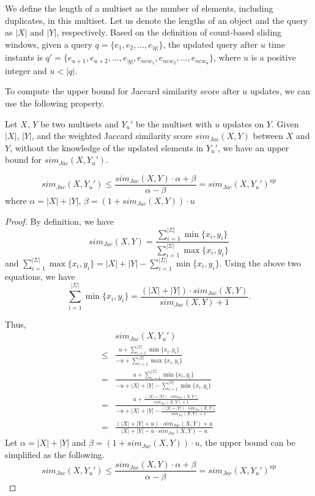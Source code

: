 We define the length of a multiset as the number of elements, including duplicates, in this multiset. Let us denote the lengths of an object and the query as $|X|$ and $|Y|$, respectively. Based on the definition of count-based sliding windows, %
%
%
given a query $q=\{e_1, e_2,..., e_{|q|}\}$, the updated query after $u$ time instants is $q'=\{e_{u+1}, e_{u+2}, ..., e_{|q|}, e_{new_1}, e_{new_2}, ..., e_{new_u}\}$, where $u$ is a positive integer and $u<|q|$.

To compute the upper bound for Jaccard similarity score after $u$ updates, we can use the following property.

\begin{property}%
Let $X$, $Y$ be two multisets and $Y_u'$ be the multiset with $u$ updates on $Y$. Given $|X|$, $|Y|$, and the weighted Jaccard similarity score $sim_{Jac}(X, Y)$ between $X$ and $Y$, without the knowledge of the updated elements in $Y_u'$, we have an upper bound for $sim_{Jac}(X, Y_u')$.

$$sim_{Jac}(X, Y_u') \leq \frac{sim_{Jac}(X, Y)\cdot \alpha+\beta}{\alpha-\beta} = sim_{Jac}(X, Y_u')^{up}$$ where $\alpha = |X| + |Y|$, $\beta = (1+sim_{Jac}(X, Y))\cdot u$
\end{property}

\begin{proof}
By definition, we have $$sim_{Jac}(X, Y) = \frac{\sum_{i=1}^{|\Sigma|} \min\{x_i, y_i\}}{\sum_{i=1}^{|\Sigma|} \max\{x_i, y_i\}}$$ and $\sum_{i=1}^{|\Sigma|} \max\{x_i, y_i\}=|X|+|Y|- \sum_{i=1}^{|\Sigma|} \min\{x_i, y_i\}$. Using the above two equations, we have $$\sum_{i=1}^{|\Sigma|} \min\{x_i, y_i\} =\frac{(|X|+|Y|)\cdot sim_{Jac}(X, Y)}{sim_{Jac}(X, Y)+1}.$$ 

Thus, 
\begin{align*}
& sim_{Jac}(X, Y_u') \\
\leq & \frac{u+\sum_{i=1}^{|\Sigma|} \min\{x_i, y_i\}}{-u+\sum_{i=1}^{|\Sigma|} \max\{x_i, y_i\}} \\
= & \frac{u+\sum_{i=1}^{|\Sigma|} \min\{x_i, y_i\}}{-u+|X|+|Y|-\sum_{i=1}^{|\Sigma|} \min\{x_i, y_i\}} \\
= & \frac{u+\frac{(|X|+|Y|)\cdot sim_{Jac}(X, Y)}{sim_{Jac}(X, Y)+1}}{-u+|X|+|Y|-\frac{(|X|+|Y|)\cdot sim_{Jac}(X, Y)}{sim_{Jac}(X, Y)+1}} \\
= & \frac{(|X|+|Y|+u)\cdot sim_{Jac}(X, Y)+u}{|X|+|Y|-u\cdot sim_{Jac}(X, Y)-u} 
\end{align*}
Let $\alpha = |X| + |Y|$ and $\beta = (1+sim_{Jac}(X, Y))\cdot u$, the upper bound can be simplified as the following.
$$sim_{Jac}(X, Y_u') \leq \frac{sim_{Jac}(X, Y)\cdot \alpha+\beta}{\alpha-\beta} = sim_{Jac}(X, Y_u')^{up}$$ 
\end{proof}

